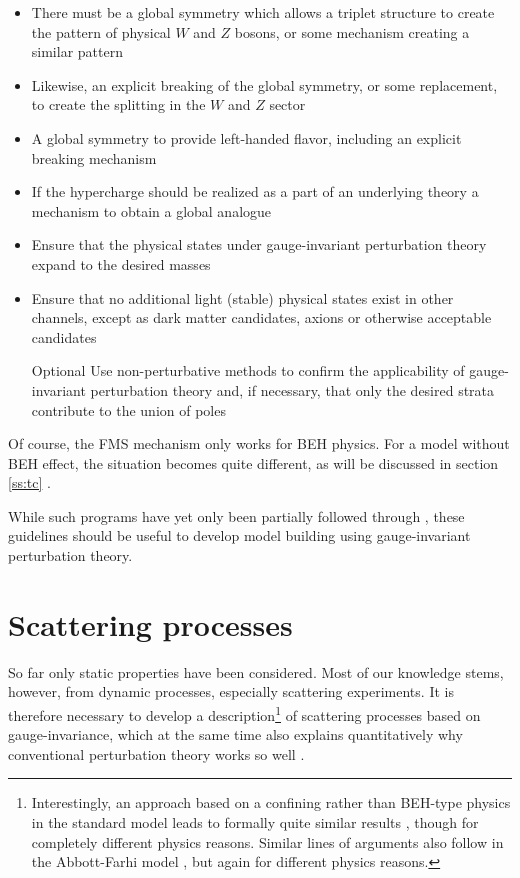 \documentclass[final,12pt,3p,longtitle]{elsarticle}
\newcommand*{\1}{1\!\!\!\bot}
\begin{document}
\begin{itemize}
 \item There must be a global symmetry which allows a triplet structure to create the pattern of physical $W$ and $Z$ bosons, or some mechanism creating a similar pattern
 \item Likewise, an explicit breaking of the global symmetry, or some replacement, to create the splitting in the $W$ and $Z$ sector
 \item A global symmetry to provide left-handed flavor, including an explicit breaking mechanism
 \item If the hypercharge should be realized as a part of an underlying theory a mechanism to obtain a global analogue
 \item Ensure that the physical states under gauge-invariant perturbation theory expand to the desired masses
 \item Ensure that no additional light (stable) physical states exist in other channels, except as dark matter candidates, axions or otherwise acceptable candidates
 \item[Optional] Use non-perturbative methods to confirm the applicability of gauge-invariant perturbation theory and, if necessary, that only the desired strata contribute to the union of poles
\end{itemize}
Of course, the FMS mechanism only works for BEH physics. For a model without BEH effect, the situation becomes quite different, as will be discussed in section \ref{ss:tc} \cite{Maas:2015gma}.

While such programs have yet only been partially followed through \cite{Maas:2015gma,Maas:2016qpu,Maas:2017xzh}, these guidelines should be useful to develop model building using gauge-invariant perturbation theory.

\section{Scattering processes}\label{s:scattering}

So far only static properties have been considered. Most of our knowledge stems, however, from dynamic processes, especially scattering experiments. It is therefore necessary to develop a description\footnote{Interestingly, an approach based on a confining rather than BEH-type physics in the standard model leads to formally quite similar results \cite{Calmet:2000th,Calmet:2001rp,Calmet:2001yd,Calmet:2002mf}, though for completely different physics reasons. Similar lines of arguments \cite{Dosch:1983hr,Dosch:1984ec} also follow in the Abbott-Farhi model \cite{Abbott:1981re}, but again for different physics reasons.} of scattering processes based on gauge-invariance, which at the same time also explains quantitatively why conventional perturbation theory works so well \cite{pdg}.
\end{document}
